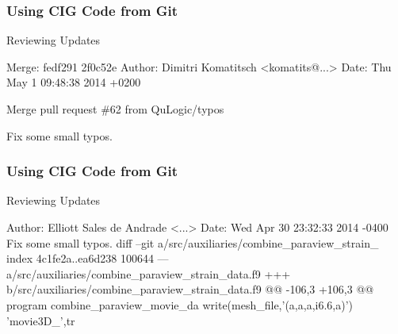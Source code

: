 \begin{frame}[fragile,t]
 \frametitle{Using CIG Code from Git}

 \begin{exampleblock}{Reviewing Updates}
  \vspace{-1em}
  \begin{semiverbatim}
Merge: fedf291 2f0c52e
Author: Dimitri Komatitsch <komatits@...>
Date:   Thu May 1 09:48:38 2014 +0200

    Merge pull request \#62 from QuLogic/typos

    Fix some small typos.
\end{semiverbatim}
 \end{exampleblock}
\end{frame}

\begin{frame}[fragile,t]
 \frametitle{Using CIG Code from Git}

 \begin{exampleblock}{Reviewing Updates}
  \vspace{-1em}
  \begin{semiverbatim}
 
Author: Elliott Sales de Andrade <...>
Date:   Wed Apr 30 23:32:33 2014 -0400
    Fix some small typos.
diff --git a/src/auxiliaries/combine_paraview_strain_
index 4c1fe2a..ea6d238 100644
--- a/src/auxiliaries/combine_paraview_strain_data.f9
+++ b/src/auxiliaries/combine_paraview_strain_data.f9
@@ -106,3 +106,3 @@ program combine_paraview_movie_da
     write(mesh_file,'(a,a,a,i6.6,a)')  'movie3D_',tr
\end{semiverbatim}
 \end{exampleblock}
\end{frame}

